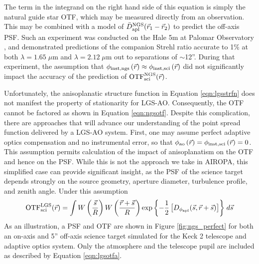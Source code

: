 The term in the integrand on the right hand side of this equation is
simply the natural guide star OTF, which may be measured
directly from an observation.  This may be combined with a model of
$\bar{D}^{\rm NGS}_{\rm apl}(\vec{r}_{1} - \vec{r}_{2})$ to
predict the off-axis PSF.  Such an experiment was
conducted on the Hale 5m at Palomar Observatory
\cite{Britton:2006}, and demonstrated predictions of the
companion Strehl ratio accurate to 1\% at both $\lambda=1.65\;\mu$m and
$\lambda=2.12\;\mu$m out to separations of $\sim$12''.
During that experiment, the
assumption that $\phi_{\rm inst,ngs}\left(\vec{r}\right) \approx
\phi_{\rm inst,sci}\left(\vec{r}\right)$ did not significantly
impact the accuracy of the prediction of ${\rm OTF}^{\rm NGS}_{\rm
  sci}(\vec{r})$. 

Unfortunately, the anisoplanatic structure function in Equation
\ref{eqn:lgsstrfn} does not manifest the property of stationarity for LGS-AO.  
Consequently, the OTF cannot be factored as shown in Equation
\ref{eqn:ngsotf}.  Despite this complication, there are approaches that
will advance our understanding of the point spread function delivered
by a LGS-AO system.  First, one may assume
perfect adaptive optics compensation and no instrumental error, so
that $\phi_{\rm ao}\left(\vec{r}\right) = 
\phi_{\rm inst,sci}\left(\vec{r}\right) = 0$.  This assumption permits
calculation of the impact of anisoplanatism on the OTF 
and hence on the PSF. While this is not the approach we take in 
AIROPA, this simplified case
can provide significant insight, as the PSF of the science target depends
strongly on the source geometry, aperture diameter, turbulence
profile, and zenith angle.  Under this assumption
\begin{equation}\label{eqn:lgsotfa}
\begin{aligned}
{\rm OTF}^{\rm LGS}_{\rm sci}(\vec{r}) = 
\int 
W \left( \frac{\vec{s}}{R} \right)
W \left( \frac{\vec{r} + \vec{s}}{R} \right) 
\exp{\left\{ -\frac{1}{2} \left[
D_{\rm \phi_{apl}}(\vec{s}, \vec{r} + \vec{s})
\right] \right\}}
\; d\vec{s} 
\end{aligned}
\end{equation}
As an illustration, a PSF and OTF are shown in Figure
\ref{fig:ngs_perfect} for both an on-axis and 5'' off-axis science
target simulated for the Keck 2 telescope and adaptive optics system. 
Only the atmosphere and the telescope pupil are included as described
by Equation \ref{eqn:lgsotfa}.
